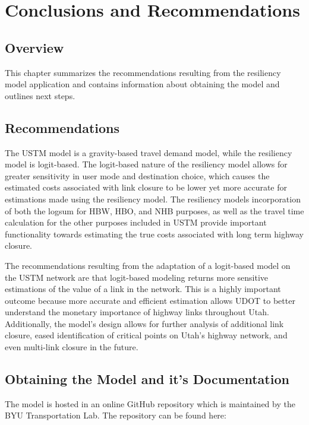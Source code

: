\chapter{Conclusions and Recommendations}
\label{chp:chapter5}
\graphicspath{{figures/}{figures/chapter5/}}

\section{Overview}

This chapter summarizes the recommendations resulting from the resiliency
model application and contains information about obtaining the model and
outlines next steps.

\section{Recommendations}

The USTM model is a gravity-based travel demand model, while the resiliency
model is logit-based. The logit-based nature of the resiliency model allows
for greater sensitivity in user mode and destination choice, which causes
the estimated costs associated with link closure to be lower yet more
accurate for estimations made using the resiliency model. The resiliency
models incorporation of both the logsum for HBW, HBO, and NHB purposes, as
well as the travel time calculation for the other purposes included in USTM
provide important functionality towards estimating the true costs
associated with long term highway closure.

The recommendations resulting from the adaptation of a logit-based model on
the USTM network are that logit-based modeling returns more sensitive
estimations of the value of a link in the network. This is a highly
important outcome because more accurate and efficient estimation allows
UDOT to better understand the monetary importance of highway links
throughout Utah. Additionally, the model’s design allows for further
analysis of additional link closure, eased identification of critical
points on Utah's highway network, and even multi-link closure in the
future.

\section{Obtaining the Model and it's Documentation}

The model is hosted in an online GitHub repository which is maintained by
the BYU Transportation Lab. The repository can be found here:

